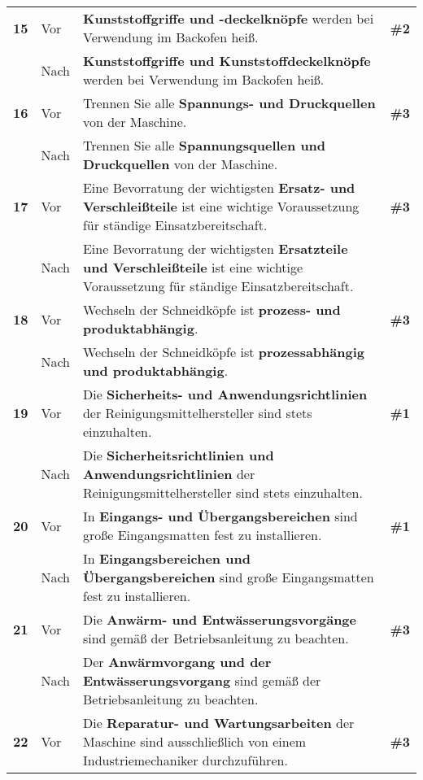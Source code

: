 \begin{longtable}{llp{}l}
\tablevspace
{ \textbf{15}} & Vor & \textbf{Kunststoffgriffe und -deckelknöpfe} werden bei Verwendung im Backofen heiß. & \textbf{\#2}\\
& Nach & \textbf{Kunststoffgriffe und Kunststoffdeckelknöpfe} werden bei Verwendung im Backofen heiß. & \\
\tablevspace
{ \textbf{16}} & Vor & Trennen Sie alle \textbf{Spannungs- und Druckquellen} von der Maschine. & \textbf{\#3}\\
& Nach & Trennen Sie alle \textbf{Spannungsquellen und Druckquellen} von der Maschine. & \\
\tablevspace
{ \textbf{17}} & Vor & Eine Bevorratung der wichtigsten \textbf{Ersatz- und Verschleißteile} ist eine wichtige Voraussetzung für ständige Einsatzbereitschaft. & \textbf{\#3}\\
& Nach & Eine Bevorratung der wichtigsten \textbf{Ersatzteile und Verschleißteile} ist eine wichtige Voraussetzung für ständige Einsatzbereitschaft. & \\
\tablevspace
{ \textbf{18}} & Vor & Wechseln der Schneidköpfe ist \textbf{prozess- und produktabhängig}. & \textbf{\#3}\\
& Nach & Wechseln der Schneidköpfe ist \textbf{prozessabhängig und produktabhängig}. & \\
\tablevspace
{ \textbf{19}} & Vor & Die \textbf{Sicherheits- und Anwendungsrichtlinien} der Reinigungsmittelhersteller sind stets einzuhalten. & \textbf{\#1}\\
& Nach & Die \textbf{Sicherheitsrichtlinien und Anwendungsrichtlinien} der Reinigungsmittelhersteller sind stets einzuhalten. & \\
\tablevspace
{ \textbf{20}} & Vor & In \textbf{Eingangs- und Übergangsbereichen} sind große Eingangsmatten fest zu installieren. & \textbf{\#1}\\
& Nach & In \textbf{Eingangsbereichen und Übergangsbereichen} sind große Eingangsmatten fest zu installieren. & \\
\tablevspace
{ \textbf{21}} & Vor & Die \textbf{Anwärm- und Entwässerungsvorgänge} sind gemäß der Betriebsanleitung zu beachten. & \textbf{\#3}\\
& Nach & Der \textbf{Anwärmvorgang und der Entwässerungsvorgang} sind gemäß der Betriebsanleitung zu beachten. & \\
\tablevspace
{ \textbf{22}} & Vor & Die \textbf{Reparatur- und Wartungsarbeiten} der Maschine sind ausschließlich von einem Industriemechaniker durchzuführen. & \textbf{\#3}\\

\end{longtable}
